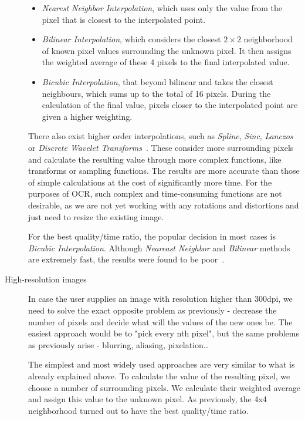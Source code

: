\begin{description}
\begin{itemize}
\item \emph{Nearest Neighbor Interpolation}, which uses only the value from the pixel that is closest to the interpolated point.

\item \emph{Bilinear Interpolation}, which considers the closest $2\times2$  neighborhood of known pixel values surrounding the unknown pixel. It then assigns the weighted average of these 4 pixels to the final interpolated value.

\item \emph{Bicubic Interpolation}, that  beyond bilinear and takes the closest  neighbours, which sums up to the total of 16 pixels. During the calculation of the final value, pixels closer to the interpolated point are given a higher weighting.
\end{itemize}

There also exist higher order interpolations, such as \emph{Spline}, \emph{Sinc}, \emph{Lanczos} or \emph{Discrete Wavelet Transforms}~\cite{interpolation}. These consider more surrounding pixels and calculate the resulting value through more complex functions, like transforms or sampling functions. The results are more accurate than those of simple calculations at the cost of significantly more time. For the purposes of OCR, such complex and time-consuming functions are not desirable, as we are not yet working with any rotations and distortions and just need to resize the existing image.

For the best quality/time ratio, the popular decision in most cases is \emph{Bicubic Interpolation}. Although \emph{Neareast Neighbor} and \emph{Bilinear} methods are extremely fast, the results were found to be poor~\cite{interpolationComp}.

\item[High-resolution images] In case the user supplies an image with resolution higher than 300dpi, we need to solve the exact opposite problem as previously - decrease the number of pixels and decide what will the values of the new ones be. The easiest approach would be to "pick every nth pixel", but the same problems as previously arise - blurring, aliasing, pixelation\ldots

The simplest and most widely used approaches are very similar to what is already explained above. To calculate the value of the resulting pixel, we choose a number of surrounding pixels. We calculate their weighted average and assign this value to the unknown pixel. As previously, the 4x4 neighborhood turned out to have the best quality/time ratio.


\end{description}
